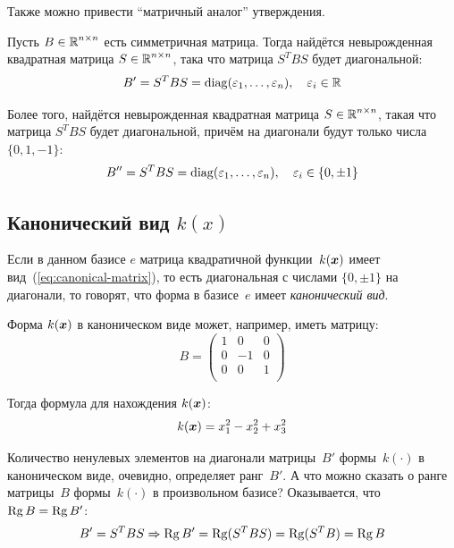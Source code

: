 \documentclass[a4paper,12pt]{article}
\begin{document}
  Также можно привести ``матричный аналог'' утверждения.
  
  \begin{theorem}
    Пусть $B \hm\in \RR^{n \times n}$ есть симметричная матрица.
    Тогда найдётся невырожденная квадратная матрица $S \hm\in \RR^{n \times n}$, така что матрица $S^T B S$ будет диагональной:
    \[
      B' = S^T B S = \operatorname{diag}(\varepsilon_1, \ldots, \varepsilon_n),\quad \varepsilon_i \in \operatorname{\mathbb R}
    \]
    
    Более того, найдётся невырожденная квадратная матрица $S \hm\in \RR^{n \times n}$, такая что матрица $S^T B S$ будет диагональной, причём на диагонали будут только числа $\{0, 1, -1\}$:
    \[
      B'' = S^T B S = \operatorname{diag}(\varepsilon_1, \ldots, \varepsilon_n),\quad \varepsilon_i \in \{0, \pm 1\}
    \]
  \end{theorem}
  
  
  \subsection{Канонический вид $k(x)$}
  
  Если в данном базисе $e$ матрица квадратичной функции~$k(\boldsymbol x)$ имеет вид~(\ref{eq:canonical-matrix}), то есть диагональная с числами $\{0, \pm 1\}$ на диагонали, то говорят, что форма в базисе~$e$ имеет \emph{канонический вид}.
  
  \begin{example}
    Форма $k(\boldsymbol x)$ в каноническом виде может, например, иметь матрицу:
    \[
      B = \begin{pmatrix}
        1 & 0  & 0\\
        0 & -1 & 0\\
        0 & 0  & 1\\
      \end{pmatrix}
    \]
    
    Тогда формула для нахождения $k(\boldsymbol x)$:
    \[
      k(\boldsymbol x) = x_1^2 - x_2^2 + x_3^2
    \]
  \end{example}
  
  Количество ненулевых элементов на диагонали матрицы~$B'$ формы~$k(\cdot)$ в каноническом виде, очевидно, определяет ранг~$B'$.
  А что можно сказать о ранге матрицы~$B$ формы~$k(\cdot)$ в произвольном базисе?
  Оказывается, что $\Rg B \hm= \Rg B'$:
  \[
    B' = S^T B S \Rightarrow \operatorname{Rg} B' = \operatorname{Rg} (S^T B S) = \operatorname{Rg} (S^T B) = \operatorname{Rg} B
  \]
  
\end{document}
